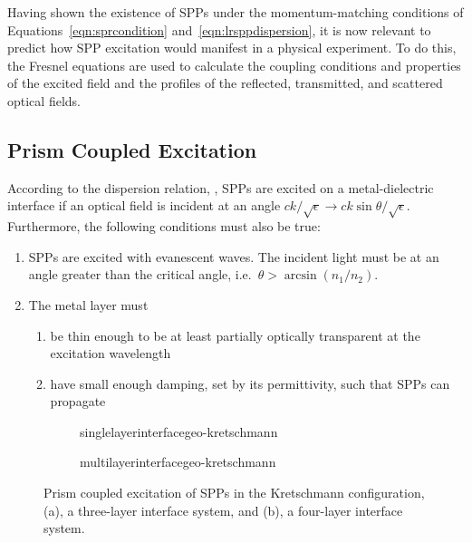 Having shown the existence of SPPs under the momentum-matching conditions
of Equations~\ref{eqn:sprcondition} and~\ref{eqn:lrsppdispersion}, it is
now relevant to predict how SPP excitation would manifest in a physical
experiment.  To do this, the Fresnel equations are used to calculate the
coupling conditions and properties of the excited field and the profiles of
the reflected, transmitted, and scattered optical fields.

\subsection{Prism Coupled Excitation}
According to the dispersion relation, , SPPs are
excited on a metal-dielectric interface if an optical field is incident at
an angle $ck/\sqrt{\epsilon} \to ck\sin\theta/\sqrt{\epsilon}$.
Furthermore, the following conditions must also be true:
\begin{enumerate}
\item SPPs are excited with evanescent waves.  The
incident light must be at an angle greater than the critical angle, i.e.\
$\theta>\arcsin\left(n_1/n_2\right)$.
\item The metal layer must
\begin{enumerate}
\item be thin enough to be at least partially optically transparent at the excitation wavelength
\item have small enough damping, set by its permittivity, such that SPPs can propagate
\end{enumerate}
\end{enumerate}

\begin{figure}[ht]
 \centering
 \begin{subfigure}[b]{0.4\textwidth}
  \centering
  {singlelayerinterfacegeo-kretschmann}
  \caption{}
 \end{subfigure}
 \begin{subfigure}[b]{0.4\textwidth}
  {multilayerinterfacegeo-kretschmann}
  \caption{}
 \end{subfigure}
\caption{Prism coupled excitation of SPPs in the Kretschmann configuration,
(a), a three-layer interface system, and (b), a four-layer interface system. }
\label{fig:prismcoupledsetups}
\end{figure}

